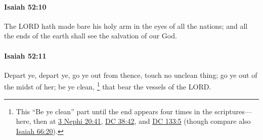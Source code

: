 		\paragraph{Isaiah 52:10} %
			\label{ISAIAH-52-10}

			The LORD hath made bare his holy arm in the eyes of all the nations; and all the ends of the earth shall see the salvation of our God.


		\paragraph{Isaiah 52:11} %
			\label{ISAIAH-52-11}

			Depart ye, depart ye, go ye out from thence, touch no unclean thing; go ye out of the midst of her; be ye clean,%
				\footnote{%
					This ``Be ye clean'' part until the end appears four times in the scriptures---here, then at \hyperref[3NEPHI-20-41]{3 Nephi 20:41}, \hyperref[DC38-42]{DC 38:42}, and \hyperref[DC133-5]{DC 133:5} (though compare also \hyperref[ISAIAH-66-20]{Isaiah 66:20}).
					}
			that bear the vessels of the LORD.

